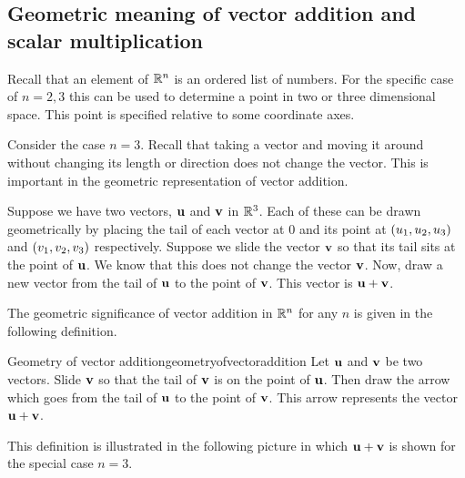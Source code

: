 \subsection{Geometric meaning of vector addition and scalar multiplication}

Recall that an element of $\mathbb{R}^{n}$ is an ordered list of
numbers. For the specific case of $n=2,3$ this can be used to
determine a point in two or three dimensional space. This point is
specified relative to some coordinate axes.

Consider the case $n=3$. Recall that taking a vector and moving it
around without changing its length or direction does not change the
vector. This is important in the geometric representation of vector
addition.

Suppose we have two vectors, ${\bf u}$ and ${\bf v}$ in
$\mathbb{R}^{3}$. Each of these can be drawn geometrically by placing
the tail of each vector at $0$ and its point at $\left(u_{1}, u_{2},
u_{3}\right)$ and $\left(v_{1}, v_{2}, v_{3}\right) $
respectively. Suppose we slide the vector ${\bf v}$ so that its tail
sits at the point of ${\bf u}$.  We know that this does not change
the vector ${\bf v}$.  Now, draw a new vector from the tail of
${\bf u}$ to the point of ${\bf v}$. This vector is
${\bf u}+{\bf v}$.

The geometric significance of vector addition in $\mathbb{R}^n$ for any $n$ is given in
the following definition.

\begin{definition}{Geometry of vector addition}{geometryofvectoraddition}
Let ${\bf u}$ and ${\bf v}$ be two vectors. Slide ${\bf v}$ so that
the tail of ${\bf v}$ is on the point of ${\bf u}$. Then draw the
arrow which goes from the tail of ${\bf u}$ to the point of ${\bf v}$. 
This arrow represents the vector ${\bf u}+{\bf v}$.

\begin{center}
\end{center}
\end{definition}

This definition is illustrated in the following picture in which
${\bf u}+{\bf v}$ is shown for the special case $n=3$.

